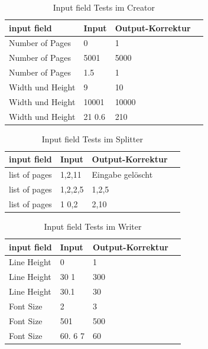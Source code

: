 \begin{table}[!htbp]
	\centering
	\begin{tabular}{|p{4cm}|p{3cm}|p{3cm}|p{3cm}|}
		\hline
		\textbf{input field}		& \textbf{Input} 	& \textbf{Output-Korrektur}	\\ 
		\hline
		Number of Pages 			& 0 				& 1 						\\ 
		Number of Pages				& 5001 				& 5000  					\\ 
		Number of Pages				& 1.5 				& 1  						\\ 
		Width und Height			& 9 				& 10						\\  
		Width und Height			& 10001 			& 10000 					\\  
		Width und Height			& 21 0.6			& 210	 					\\
		\hline
	\end{tabular}
	\caption{Input field Tests im Creator}
	\label{table:creator-input}
\end{table}

\begin{table}[!htbp]
	\centering
	\begin{tabular}{|p{4cm}|p{3cm}|p{3cm}|p{3cm}|}
		\hline
		\textbf{input field}	& \textbf{Input} 	& \textbf{Output-Korrektur}		\\ 
		\hline
		list of pages			& 1,2,11			& Eingabe gelöscht  			\\ 
		list of pages			& 1,2,2,5			& 1,2,5 						\\ 
		list of pages			& 1 0,2				& 2,10							\\ 
		\hline
	\end{tabular}
	\caption{Input field Tests im Splitter}
	\label{table:splitter-input}
\end{table}

\begin{table}[!htbp]
	\centering
	\begin{tabular}{|p{4cm}|p{3cm}|p{3cm}|p{3cm}|}
		\hline
		\textbf{input field}			& \textbf{Input} 			& \textbf{Output-Korrektur}		\\ 
		\hline
		Line Height 					& 0 						& 1  							\\
		Line Height						& 30 1 						& 300 							\\ 
		Line Height						& 30.1 						& 30							\\ 
		Font Size 						& 2							& 3  							\\
		Font Size						& 501						& 500 							\\ 
		Font Size						& 60. 6 7					& 60 							\\ 
		\hline
	\end{tabular}
	\caption{Input field Tests im Writer}
	\label{table:text-input}
\end{table}

